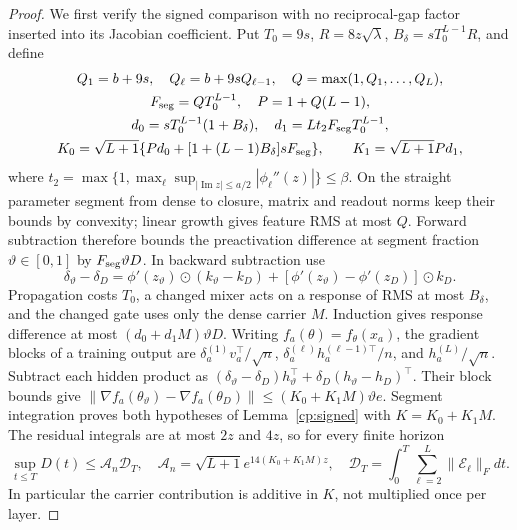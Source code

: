\begin{proof}
We first verify the signed comparison with no reciprocal-gap factor
inserted into its Jacobian coefficient.  Put $T_0=9s$,
$R=8z\sqrt\lambda$, $B_\delta=sT_0^{L-1}R$, and define
\begin{gather*}
 Q_1=b+9s,\quad Q_\ell=b+9sQ_{\ell-1},\quad
 Q=\max(1,Q_1,\ldots,Q_L),\\
 F_{\rm seg}=QT_0^{L-1},\quad P=1+Q(L-1),\\
 d_0=sT_0^{L-1}(1+B_\delta),\quad
 d_1=Lt_2F_{\rm seg}T_0^{L-1},\\
 K_0=\sqrt{L+1}\{Pd_0+[1+(L-1)B_\delta]sF_{\rm seg}\},
 \qquad K_1=\sqrt{L+1}Pd_1,
\end{gather*}
where $t_2=\max\{1,\max_\ell\sup_{|\operatorname{Im}z|\le a/2}
|\phi_\ell''(z)|\}\le\beta$.
On the straight parameter segment from dense to closure, matrix and
readout norms keep their bounds by convexity; linear growth gives
feature RMS at most $Q$.  Forward subtraction therefore bounds the
preactivation difference at segment fraction $\vartheta\in[0,1]$ by $F_{\rm seg}\vartheta D$.
In backward subtraction use
\[
 \delta_\vartheta-\delta_D
 =\phi'(z_\vartheta)\odot(k_\vartheta-k_D)
       +[\phi'(z_\vartheta)-\phi'(z_D)]\odot k_D.
\]
Propagation costs $T_0$, a changed mixer acts on a response of RMS at
most $B_\delta$, and the changed gate uses only the dense carrier $M$.
Induction gives response difference at most $(d_0+d_1M)\vartheta D$.
Writing $f_a(\theta)=f_\theta(x_a)$, the gradient blocks of a training output are
$\delta_a^{(1)}v_a^\top/\sqrt n$,
$\delta_a^{(\ell)}h_a^{(\ell-1)\top}/n$, and
$h_a^{(L)}/\sqrt n$.
Subtract each hidden product as
$(\delta_\vartheta-\delta_D)h_\vartheta^\top+\delta_D(h_\vartheta-h_D)^\top$.
Their block bounds give
$\|\nabla f_a(\theta_\vartheta)-\nabla f_a(\theta_D)\|
\le(K_0+K_1M)\vartheta e$.
Segment integration proves both hypotheses of Lemma~\ref{cp:signed}
with $K=K_0+K_1M$.  The residual integrals are at most $2z$ and $4z$,
so for every finite horizon
\begin{equation}
 \sup_{t\le T}D(t)\le\mathcal A_n\mathcal D_T,
 \quad\mathcal A_n=\sqrt{L+1}e^{14(K_0+K_1M)z},
 \quad\mathcal D_T=\int_0^T\sum_{\ell=2}^L\|\mathcal E_\ell\|_Fdt.
 \label{cp:eq-legendre-signed}
\end{equation}
In particular the carrier contribution is additive in $K$, not
multiplied once per layer.


\end{proof}

